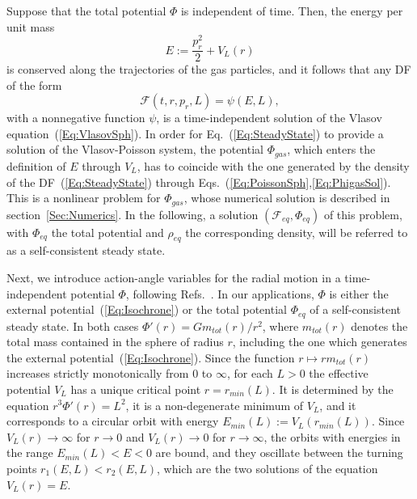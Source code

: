 Suppose that the total potential $\Phi$ is independent of time. Then, the energy per unit mass
\begin{equation}
E := \frac{p_r^2}{2} + V_L(r)
\label{Eq:EDef}
\end{equation}
is conserved along the trajectories of the gas particles, and it follows that any DF of the form
\begin{equation}
\mathcal{F}(t,r,p_r,L) = \psi(E,L),
\label{Eq:SteadyState}
\end{equation}
with a nonnegative function $\psi$, is a time-independent solution of the Vlasov equation~(\ref{Eq:VlasovSph}). In order for Eq.~(\ref{Eq:SteadyState}) to provide a solution of the Vlasov-Poisson system, the potential $\Phi_{gas}$, which enters the definition of $E$ through $V_L$, has to coincide with the one generated by the density of the DF~(\ref{Eq:SteadyState}) through Eqs.~(\ref{Eq:PoissonSph},\ref{Eq:PhigasSol}). This is a nonlinear problem for $\Phi_{gas}$, whose numerical solution is described in section~\ref{Sec:Numerics}. In the following, a solution $(\mathcal{F}_{eq},\Phi_{eq})$ of this problem, with $\Phi_{eq}$ the total potential and $\rho_{eq}$ the corresponding density, will be referred to as a self-consistent steady state.

Next, we introduce action-angle variables for the radial motion in a time-independent potential $\Phi$, following Refs.~\cite{BinneyTremaine-Book,pRoS20}. In our applications, $\Phi$ is either the external potential~(\ref{Eq:Isochrone}) or the total potential $\Phi_{eq}$ of a self-consistent steady state. In both cases $\Phi'(r) = G m_{tot}(r)/r^2$, where $m_{tot}(r)$ denotes the total mass contained in the sphere of radius $r$, including the one which generates the external potential~(\ref{Eq:Isochrone}). Since the function $r\mapsto r m_{tot}(r)$ increases strictly monotonically from $0$ to $\infty$, for each $L > 0$ the effective potential $V_L$ has a unique critical point $r = r_{min}(L)$. It is determined by the equation $r^3\Phi'(r) = L^2$, it is a non-degenerate minimum of $V_L$, and it corresponds to a circular orbit with energy $E_{min}(L) := V_L(r_{min}(L))$. Since $V_L(r)\to \infty$ for $r\to 0$ and $V_L(r)\to 0$ for $r\to \infty$, the orbits with energies in the range $E_{min}(L) < E < 0$ are bound, and they oscillate between the turning points $r_1(E,L) < r_2(E,L)$, which are the two solutions of the equation $V_L(r) = E$.

